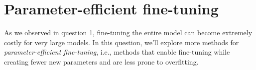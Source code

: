 \section{Parameter-efficient fine-tuning}

As we observed in question 1, fine-tuning the entire model can become extremely costly for very large models. In this question, we'll explore more methods for \textit{parameter-efficient fine-tuning}, i.e., methods that enable fine-tuning while creating fewer new parameters and are less prone to overfitting.

\begin{enumerate}[label={3.\alph*}]
    
    
    
    
\end{enumerate}